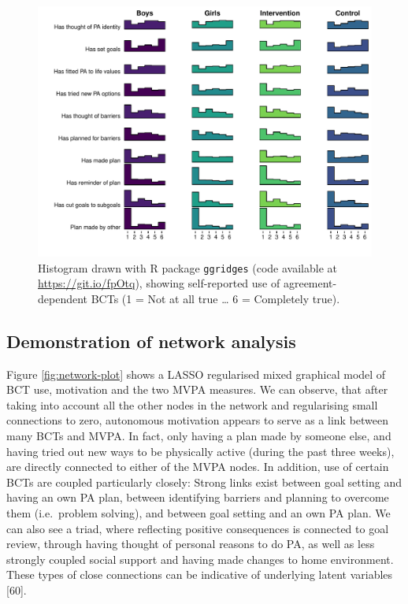 \documentclass[english,man,floatsintext]{apa6}
\begin{document}
\begin{figure}
\centering
\includegraphics{_baseline-manuscript_files/figure-latex/histogram-agreementDependentBCTs-1.pdf}
\caption{\label{fig:histogram-agreementDependentBCTs}Histogram drawn with R package \texttt{ggridges} (code available at \url{https://git.io/fpOtq}), showing self-reported use of agreement-dependent BCTs (1 = Not at all true \ldots{} 6 = Completely true).}
\end{figure}

\hypertarget{demonstration-of-network-analysis}{%
\subsection{Demonstration of network analysis}\label{demonstration-of-network-analysis}}

Figure \ref{fig:network-plot} shows a LASSO regularised mixed graphical model of BCT use, motivation and the two MVPA measures. We can observe, that after taking into account all the other nodes in the network and regularising small connections to zero, autonomous motivation appears to serve as a link between many BCTs and MVPA. In fact, only having a plan made by someone else, and having tried out new ways to be physically active (during the past three weeks), are directly connected to either of the MVPA nodes. In addition, use of certain BCTs are coupled particularly closely: Strong links exist between goal setting and having an own PA plan, between identifying barriers and planning to overcome them (i.e.~problem solving), and between goal setting and an own PA plan. We can also see a triad, where reflecting positive consequences is connected to goal review, through having thought of personal reasons to do PA, as well as less strongly coupled social support and having made changes to home environment. These types of close connections can be indicative of underlying latent variables {[}60{]}.
\end{document}
